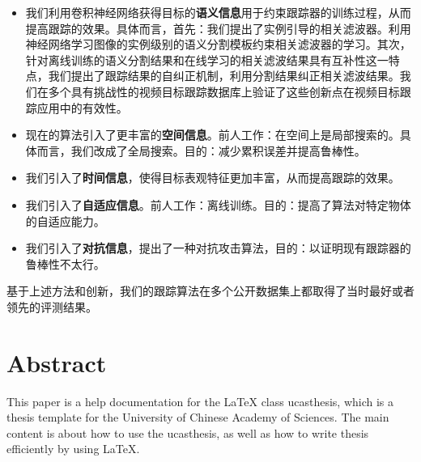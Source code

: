 \begin{itemize}
\item{我们利用卷积神经网络获得目标的\textbf{语义信息}用于约束跟踪器的训练过程，从而提高跟踪的效果。具体而言，首先：我们提出了实例引导的相关滤波器。利用神经网络学习图像的实例级别的语义分割模板约束相关滤波器的学习。其次，针对离线训练的语义分割结果和在线学习的相关滤波结果具有互补性这一特点，我们提出了跟踪结果的自纠正机制，利用分割结果纠正相关滤波结果。我们在多个具有挑战性的视频目标跟踪数据库上验证了这些创新点在视频目标跟踪应用中的有效性。}
\item{现在的算法引入了更丰富的\textbf{空间信息}。前人工作：在空间上是局部搜索的。具体而言，我们改成了全局搜索。目的：减少累积误差并提高鲁棒性。}
\item{我们引入了\textbf{时间信息}，使得目标表观特征更加丰富，从而提高跟踪的效果。}
\item{我们引入了\textbf{自适应信息}。前人工作：离线训练。目的：提高了算法对特定物体的自适应能力。}
\item{我们引入了\textbf{对抗信息}，提出了一种对抗攻击算法，目的：以证明现有跟踪器的鲁棒性不太行。}
\end{itemize}

基于上述方法和创新，我们的跟踪算法在多个公开数据集上都取得了当时最好或者领先的评测结果。

\intobmk\chapter*{Abstract}%

This paper is a help documentation for the \LaTeX{} class ucasthesis, which is  a thesis template for the University of Chinese Academy of Sciences. The main content is about how to use the ucasthesis, as well as how to write thesis efficiently by using \LaTeX{}.

